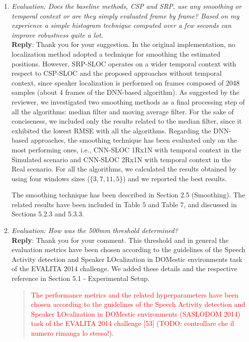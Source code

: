 \documentclass[11pt, technote, letterpaper, oneside, onecolumn]{IEEEtran}
\begin{document}
\begin{enumerate}
\item \textit{Evaluation: Does the baseline methods, CSP and SRP, use any smoothing or temporal context or are they simply evaluated frame by frame? Based on my experience a simple histogram technique computed over a few seconds can improve robustness quite a lot.\\} \label{resp:smooth}
\textbf{Reply}: Thank you for your suggestion. In the original implementation, no localization method adopted a technique for smoothing the estimated positions. However, SRP-SLOC operates on a wider temporal context with respect to CSP-SLOC and the proposed approaches without temporal context, since speaker localization is performed on frames composed of 2048 samples (about 4 frames of the DNN-based algorithm). As suggested by the reviewer, we investigated two smoothing methods as a final processing step of all the algorithms: median filter and moving average filter. For the sake of conciseness, we included only the results related to the median filter, since it exhibited the lowest RMSE with all the algorithms. Regarding the DNN-based approaches, the smoothing technique has been evaluated only on the most performing ones, i.e., CNN-SLOC 1Rx1N with temporal context in the Simulated scenario and CNN-SLOC 2Rx1N with temporal context in the Real scenario. For all the algorithms, we calculated the results obtained by using four windows sizes ($\{3,7,11,5\}$) and we reported the best results.

The smoothing technique has been described in Section 2.5 (Smoothing). The related results have been included in Table 5 and Table 7, and discussed in Sections 5.2.3 and 5.3.3.

\item \textit{Evaluation: How was the 500mm threshold determined?\\}
\textbf{Reply}: Thank you for your comment. This threshold and in general the evaluation metrics have been chosen according to the guidelines of the Speech Activity detection and Speaker LOcalization in DOMestic environments task of the EVALITA 2014 challenge. We added these details and the respective reference in Section 5.1 - Experimental Setup.
\begin{quote}
	\textcolor{red}{The performance metrics and the related hyperparameters have been chosen according to the guidelines of the Speech Activity detection and Speaker LOcalization in DOMestic environments (SASLODOM 2014) task of the EVALITA 2014 challenge [53] (TODO: controllare che il numero rimanga lo stesso!).}
\end{quote}


\end{enumerate}
\end{document}

